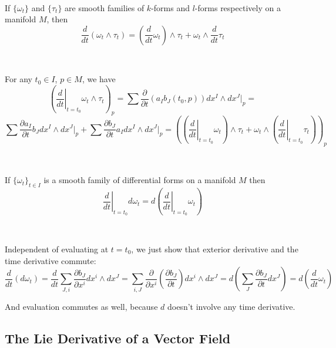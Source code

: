 \documentclass{article}
\begin{document}
\begin{proposition}
  \

  If $\{\omega_t\}$ and $\{\tau_t\}$ are smooth families of $k$-forms and $l$-forms respectively on a manifold $M$, then $$\frac{d}{dt}(\omega_t \wedge \tau_t) = (\frac{d}{dt}\omega_t) \wedge \tau_t + \omega_t \wedge \frac{d}{dt} \tau_t$$
\end{proposition}

\begin{customproof}
  \

  For any $t_0 \in I$, $p \in M$, we have $$(\left.\frac{d}{dt}\right\vert_{t=t_0} \omega_t \wedge \tau_t)_p = \sum \frac{\partial}{\partial t}(a_Ib_J(t_0,p)) dx^I \wedge dx^J \vert_p =$$$$ \sum \frac{\partial a_I}{\partial t}b_J dx^I \wedge dx^J \vert_p + \sum \frac{\partial b_J}{\partial t}a_I dx^I\wedge dx^J \vert_p = ((\left.\frac{d}{dt}\right\vert_{t=t_0} \omega_t)\wedge \tau_t + \omega_t \wedge (\left.\frac{d}{dt}\right\vert_{t=t_0}\tau_t))_p$$
\end{customproof}

\begin{proposition}
  \

  If $\{\omega_t\}_{t \in I}$ is a smooth family of differential forms on a manifold $M$ then $$\left.\frac{d}{dt}\right\vert_{t=t_0} d\omega_t = d(\left.\frac{d}{dt}\right\vert_{t=t_0} \omega_t)$$
\end{proposition}

\begin{customproof}
  \

  Independent of evaluating at $t = t_0$, we just show that exterior derivative and the time derivative commute: $$\frac{d}{dt}(d\omega_t) = \frac{d}{dt} \sum_{J,i} \frac{\partial b_J}{\partial x^i} dx^i \wedge dx^J = \sum_{i,J} \frac{\partial}{\partial x^i} (\frac{\partial b_J}{\partial t}) dx^i \wedge dx^J = d(\sum_J \frac{\partial b_J}{\partial t}dx^J) = d(\frac{d}{dt}\omega_t)$$

  And evaluation commutes as well, because $d$ doesn't involve any time derivative.
\end{customproof}

\subsection{The Lie Derivative of a Vector Field}
\
\end{document}
